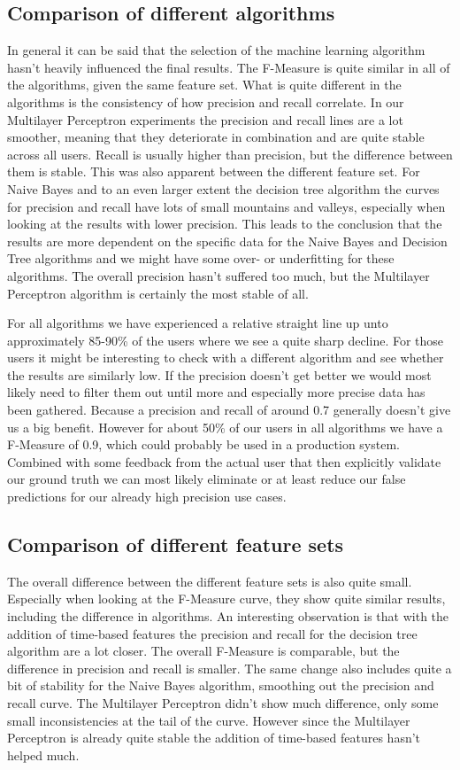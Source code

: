 \subsection{Comparison of different algorithms}
In general it can be said that the selection of the machine learning algorithm hasn't heavily influenced the final results. The F-Measure is quite similar in all of the algorithms, given the same feature set. What is quite different in the algorithms is the consistency of how precision and recall correlate. In our Multilayer Perceptron experiments the precision and recall lines are a lot smoother, meaning that they deteriorate in combination and are quite stable across all users. Recall is usually higher than precision, but the difference between them is stable. This was also apparent between the different feature set. For Naive Bayes and to an even larger extent the decision tree algorithm the curves for precision and recall have lots of small mountains and valleys, especially when looking at the results with lower precision. This leads to the conclusion that the results are more dependent on the specific data for the Naive Bayes and Decision Tree algorithms and we might have some over- or underfitting for these algorithms. The overall precision hasn't suffered too much, but the Multilayer Perceptron algorithm is certainly the most stable of all.

For all algorithms we have experienced a relative straight line up unto approximately 85-90\% of the users where we see a quite sharp decline. For those users it might be interesting to check with a different algorithm and see whether the results are similarly low. If the precision doesn't get better we would most likely need to filter them out until more and especially more precise data has been gathered. Because a precision and recall of around 0.7 generally doesn't give us a big benefit. However for about 50\% of our users in all algorithms we have a F-Measure of 0.9, which could probably be used in a production system. Combined with some feedback from the actual user that then explicitly validate our ground truth we can most likely eliminate or at least reduce our false predictions for our already high precision use cases.

\subsection{Comparison of different feature sets}
The overall difference between the different feature sets is also quite small. Especially when looking at the F-Measure curve, they show quite similar results, including the difference in algorithms. An interesting observation is that with the addition of time-based features the precision and recall for the decision tree algorithm are a lot closer. The overall F-Measure is comparable, but the difference in precision and recall is smaller. The same change also includes quite a bit of stability for the Naive Bayes algorithm, smoothing out the precision and recall curve. The Multilayer Perceptron didn't show much difference, only some small inconsistencies at the tail of the curve. However since the Multilayer Perceptron is already quite stable the addition of time-based features hasn't helped much.

